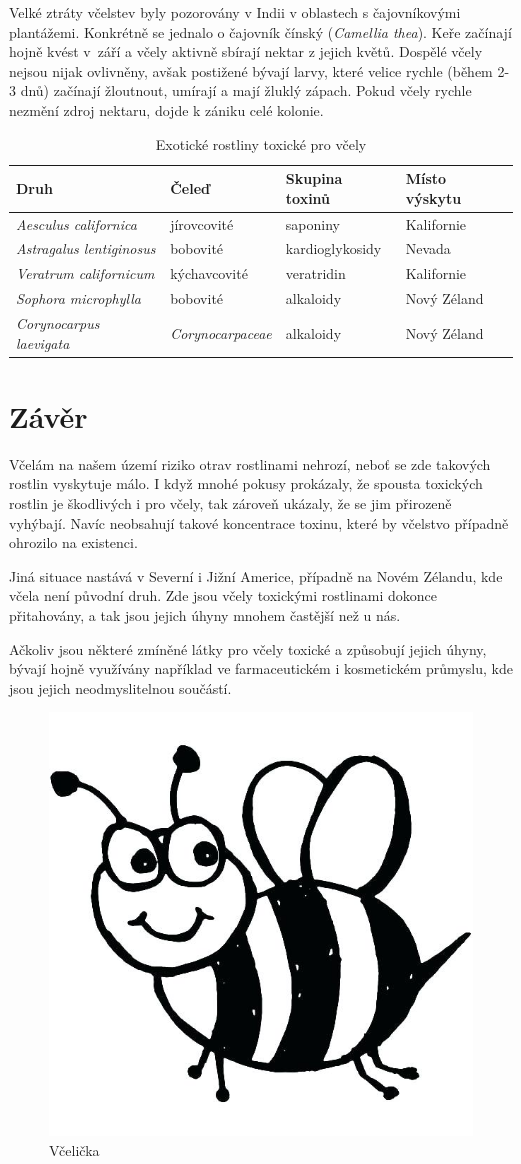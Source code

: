 \documentclass[openany, oneside, a4paper, 12pt, final]{memoir}
\begin{document}
Velké ztráty včelstev byly pozorovány v Indii v oblastech s čajovníkovými plantážemi. Konkrétně se jednalo o čajovník čínský (\textit{Camellia thea}). Keře začínají hojně kvést v~září a včely aktivně sbírají nektar z jejich květů. 
Dospělé včely nejsou nijak ovlivněny, avšak postižené bývají larvy, které velice rychle (během 2-3 dnů) začínají žloutnout, umírají a mají žluklý zápach. {\tiny }Pokud včely rychle nezmění zdroj nektaru, dojde k zániku celé kolonie. \cite{sharma1986toxicity} 


\begin{table}
	\begin{center}
		\begin{tabular}{llll} 
			\toprule
			Druh & Čeleď & Skupina toxinů & Místo výskytu\\
			\midrule
			\textit{Aesculus californica} & jírovcovité & saponiny & Kalifornie\\
			\textit{Astragalus lentiginosus} & bobovité & kardioglykosidy & Nevada\\
			\textit{Veratrum californicum} & kýchavcovité & veratridin & Kalifornie\\
			\textit{Sophora microphylla} & bobovité & alkaloidy & Nový Zéland\\
			\textit{Corynocarpus laevigata} & \textit{Corynocarpaceae} & alkaloidy & Nový Zéland\\
			\bottomrule
		\end{tabular}
	\end{center}
	\caption{Exotické rostliny toxické pro včely}
	\label{table:exotika}
\end{table}

\chapter*{Závěr}
Včelám na našem území riziko otrav rostlinami nehrozí, neboť se zde takových rostlin vyskytuje málo. 
I když mnohé pokusy prokázaly, že spousta toxických rostlin je škodlivých i pro včely, tak zároveň ukázaly, že se jim přirozeně vyhýbají. Navíc neobsahují takové koncentrace toxinu, které by včelstvo případně ohrozilo na existenci.

Jiná situace nastává v Severní i Jižní Americe, případně na Novém Zélandu, kde včela není původní druh. Zde jsou včely toxickými rostlinami dokonce přitahovány, a tak jsou jejich úhyny mnohem častější než u nás.


Ačkoliv jsou některé zmíněné látky pro včely toxické a způsobují jejich úhyny, bývají hojně využívány například ve farmaceutickém i kosmetickém průmyslu, kde jsou jejich neodmyslitelnou součástí.

\vspace{2cm}

\begin{figure}[h!]
\begin{center}
\includegraphics[width=.25\linewidth]{images/vcelka.jpg}
\end{center}
\caption*{Včelička \cite{vcelicka}}
\end{figure}

\label{chap:conclusion}
\printbibliography
\end{document}
